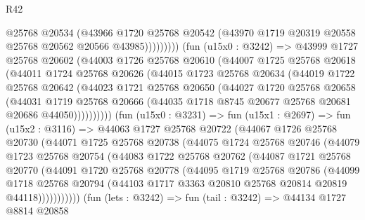 \begin{lexlean}{R42}
\begin{coremodule}
                      @25768
                      @20534
                      (@43966
                        @1720
                        @25768
                        @20542
                        (@43970 @1719 @20319 @20558 @25768 @20562 @20566 @43985)))))))))
        (fun (u15x0 : @3242) =>
        @43999
          @1727
          @25768
          @20602
          (@44003
            @1726
            @25768
            @20610
            (@44007
              @1725
              @25768
              @20618
              (@44011
                @1724
                @25768
                @20626
                (@44015
                  @1723
                  @25768
                  @20634
                  (@44019
                    @1722
                    @25768
                    @20642
                    (@44023
                      @1721
                      @25768
                      @20650
                      (@44027
                        @1720
                        @25768
                        @20658
                        (@44031
                          @1719
                          @25768
                          @20666
                          (@44035 @1718 @8745 @20677 @25768 @20681 @20686 @44050))))))))))
        (fun (u15x0 : @3231) =>
        fun (u15x1 : @2697) =>
        fun (u15x2 : @3116) =>
        @44063
          @1727
          @25768
          @20722
          (@44067
            @1726
            @25768
            @20730
            (@44071
              @1725
              @25768
              @20738
              (@44075
                @1724
                @25768
                @20746
                (@44079
                  @1723
                  @25768
                  @20754
                  (@44083
                    @1722
                    @25768
                    @20762
                    (@44087
                      @1721
                      @25768
                      @20770
                      (@44091
                        @1720
                        @25768
                        @20778
                        (@44095
                          @1719
                          @25768
                          @20786
                          (@44099
                            @1718
                            @25768
                            @20794
                            (@44103 @1717 @3363 @20810 @25768 @20814 @20819 @44118)))))))))))
        (fun (lets : @3242) =>
        fun (tail : @3242) =>
        @44134
          @1727
          @8814
          @20858

\end{coremodule}
\end{lexlean}
